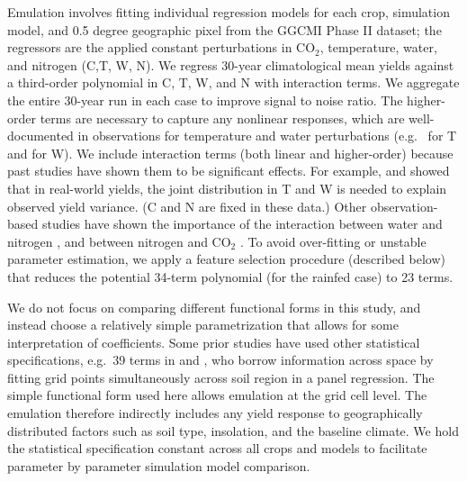 \documentclass[gmd, manuscript]{copernicus} %
\begin{document}
Emulation involves fitting individual regression models for each crop, simulation model, and 0.5 degree geographic pixel from the GGCMI Phase II dataset; the regressors are the applied constant perturbations in CO$_2$, temperature, water, and nitrogen (C,T, W, N).  We regress 30-year climatological mean yields against a third-order polynomial in C, T, W, and N with interaction terms. We aggregate the entire 30-year run in each case to improve signal to noise ratio. The higher-order terms are necessary to capture any nonlinear responses, which are well-documented in observations for temperature and water perturbations (e.g.\ \citet{Schlenker2009} for T and \citet{He2016} for W). We include interaction terms (both linear and higher-order) because past studies have shown them to be significant effects. For example, \citet{Lobell2007} and \citet{Tebaldi2008} showed that in real-world yields, the joint distribution in T and W is needed to explain observed yield variance. (C and N are fixed in these data.) Other observation-based studies have shown the importance of the interaction between water and nitrogen \citep[e.g.][]{AULAKH2005}, and between nitrogen and CO$_2$ \citep{Mitsuru92, Nakamura97}. To avoid over-fitting or unstable parameter estimation, we apply a feature selection procedure (described below) that reduces the potential 34-term polynomial (for the rainfed case) to 23 terms.

We do not focus on comparing different functional forms in this study, and instead choose a relatively simple parametrization that allows for some interpretation of coefficients. Some prior studies have used other statistical specifications, e.g.\ 39 terms in \citet{BLANC2015} and \citet{BLANC2017}, who borrow information across space by fitting grid points simultaneously across soil region in a panel regression. The simple functional form used here allows emulation at the grid cell level. The emulation therefore indirectly includes any yield response to geographically distributed factors such as soil type, insolation, and the baseline climate. We hold the statistical specification constant across all crops and models to facilitate parameter by parameter simulation model comparison.
\end{document}
